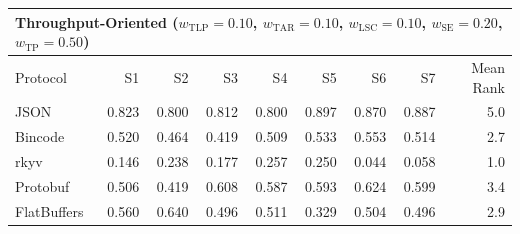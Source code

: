 \begin{table}[htbp]
\begin{tabular}{lrrrrrrrr}
\hline
\multicolumn{9}{l}{\textbf{Throughput-Oriented} ($w_{\mathrm{TLP}}=0.10$, $w_{\mathrm{TAR}}=0.10$, $w_{\mathrm{LSC}}=0.10$, $w_{\mathrm{SE}}=0.20$, $w_{\mathrm{TP}}=0.50$)} \\
\hline
Protocol & S1 & S2 & S3 & S4 & S5 & S6 & S7 & Mean Rank \\
\hline
  JSON & 0.823 & 0.800 & 0.812 & 0.800 & 0.897 & 0.870 & 0.887 & 5.0 \\
  Bincode & 0.520 & 0.464 & 0.419 & 0.509 & 0.533 & 0.553 & 0.514 & 2.7 \\
  rkyv & 0.146 & 0.238 & 0.177 & 0.257 & 0.250 & 0.044 & 0.058 & 1.0 \\
  Protobuf & 0.506 & 0.419 & 0.608 & 0.587 & 0.593 & 0.624 & 0.599 & 3.4 \\
  FlatBuffers & 0.560 & 0.640 & 0.496 & 0.511 & 0.329 & 0.504 & 0.496 & 2.9 \\
\hline
\end{tabular}
\vspace{0.5em}

\end{table}
